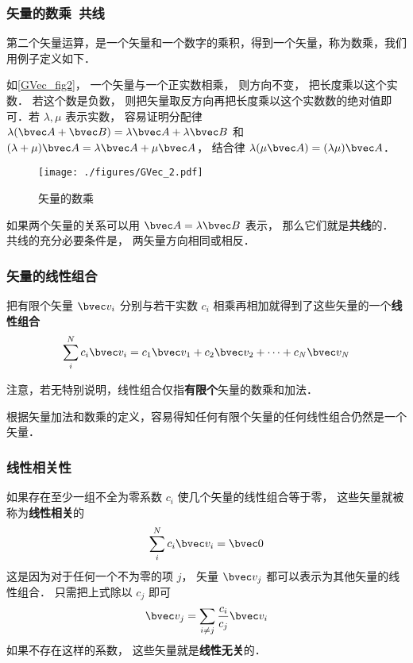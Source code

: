 \subsubsection{矢量的数乘\ 共线}
第二个矢量运算，是一个矢量和一个数字的乘积，得到一个矢量，称为数乘，我们用例子定义如下．

如\autoref{GVec_fig2}， 一个矢量与一个正实数相乘， 则方向不变， 把长度乘以这个实数． 若这个数是负数， 则把矢量取反方向再把长度乘以这个实数数的绝对值即可．若 $\lambda, \mu$ 表示实数， 容易证明分配律 $\lambda(\bvec A + \bvec B) = \lambda\bvec A + \lambda\bvec B$ 和 $(\lambda+\mu)\bvec A = \lambda\bvec A + \mu\bvec A$， 结合律 $\lambda(\mu\bvec A) = (\lambda\mu) \bvec A$．
\begin{figure}[ht]
\centering
\texttt{[image: ./figures/GVec\_2.pdf]}
\caption{矢量的数乘} \label{GVec_fig2}
\end{figure}

如果两个矢量的关系可以用 $\bvec A = \lambda\bvec B$ 表示， 那么它们就是\textbf{共线}的． 共线的充分必要条件是， 两矢量方向相同或相反．

\subsubsection{矢量的线性组合}
把有限个矢量 $\bvec v_i$ 分别与若干实数 $c_i$ 相乘再相加就得到了这些矢量的一个\textbf{线性组合}
\begin{equation}\label{GVec_eq1}
\sum_i^N c_i \bvec v_i = c_1\bvec v_1 + c_2\bvec v_2 +\dots +c_N \bvec v_N
\end{equation}

注意，若无特别说明，线性组合仅指\textbf{有限个}矢量的数乘和加法．

根据矢量加法和数乘的定义，容易得知任何有限个矢量的任何线性组合仍然是一个矢量．


\subsubsection{线性相关性}

如果存在至少一组不全为零系数 $c_i$ 使几个矢量的线性组合等于零， 这些矢量就被称为\textbf{线性相关}的
\begin{equation}\label{GVec_eq2}
\sum_i^N c_i \bvec v_i = \bvec 0
\end{equation}
这是因为对于任何一个不为零的项 $j$， 矢量 $\bvec v_j$ 都可以表示为其他矢量的线性组合． 只需把上式除以 $c_j$ 即可
\begin{equation}\label{GVec_eq3}
\bvec v_j = \sum_{i \ne j}\frac{c_i}{c_j} \bvec v_i
\end{equation}
如果不存在这样的系数， 这些矢量就是\textbf{线性无关}的． 

